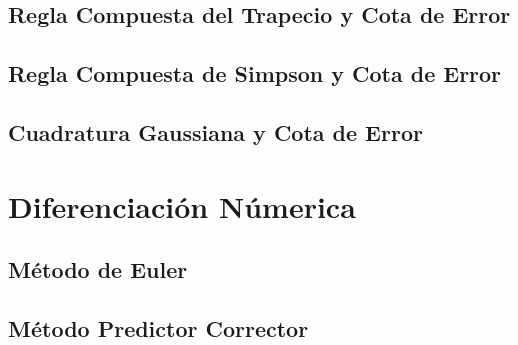 \documentclass[10pt,a4paper]{article}
\begin{document}
	
	
	\subsection{Regla Compuesta del Trapecio y Cota de Error}
	
		
	
	\subsection{Regla Compuesta de Simpson y Cota de Error}

	
	
	\subsection{Cuadratura Gaussiana y Cota de Error}

	
	
	\section{Diferenciación Númerica}
	
	\subsection{Método de Euler}
	
	

	\subsection{Método Predictor Corrector}
	
\end{document}
